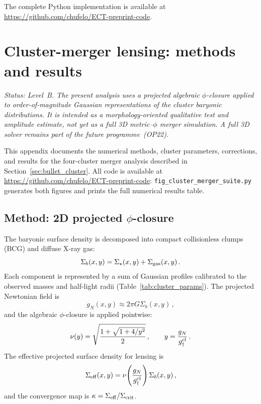 \documentclass[11pt,a4paper]{article}
\numberwithin{equation}{section}
\begin{document}
The complete Python implementation is available at\\
\url{https://github.com/chufelo/ECT-preprint-code}.



\section{Cluster-merger lensing: methods and results}
\label{app:cluster_lensing}

\textit{Status: Level~B. The present analysis uses a projected
algebraic $\phi$-closure applied to order-of-magnitude Gaussian
representations of the cluster baryonic distributions.
It is intended as a morphology-oriented qualitative test and
amplitude estimate, not yet as a full 3D metric--$\phi$
merger simulation.  A full 3D solver remains part of the future
programme~(OP22).}

This appendix documents the numerical methods, cluster parameters,
corrections, and results for the four-cluster merger analysis
described in Section~\ref{sec:bullet_cluster}.
All code is available at
\url{https://github.com/chufelo/ECT-preprint-code}:
\texttt{fig\_cluster\_merger\_suite.py} generates both figures and
prints the full numerical results table.

\subsection{Method: 2D projected $\phi$-closure}
\label{app:cluster_2d}

The baryonic surface density is decomposed into compact
collisionless clumps (BCG) and diffuse X-ray gas:
\begin{equation}
  \Sigma_b(x,y) = \Sigma_\star(x,y) + \Sigma_{\rm gas}(x,y)\,.
\end{equation}
Each component is represented by a sum of Gaussian profiles
calibrated to the observed masses and half-light radii
(Table~\ref{tab:cluster_params}).
The projected Newtonian field is~\cite{Clowe2006}
\begin{equation}
  g_N(x,y) \approx 2\pi G\Sigma_b(x,y)\,,
\end{equation}
and the algebraic $\phi$-closure is applied pointwise:
\begin{equation}
  \nu(y) = \sqrt{\frac{1+\sqrt{1+4/y^2}}{2}}\,,\qquad
  y = \frac{g_N}{g_\dagger^{\rm cl}}\,.
  \label{eq:nu_cluster}
\end{equation}
The effective projected surface density for lensing is
\begin{equation}
  \Sigma_{\rm eff}(x,y) = \nu\!\left(\frac{g_N}{g_\dagger^{\rm cl}}\right)
  \Sigma_b(x,y)\,,
\end{equation}
and the convergence map is $\kappa=\Sigma_{\rm eff}/\Sigma_{\rm crit}$.
\end{document}
